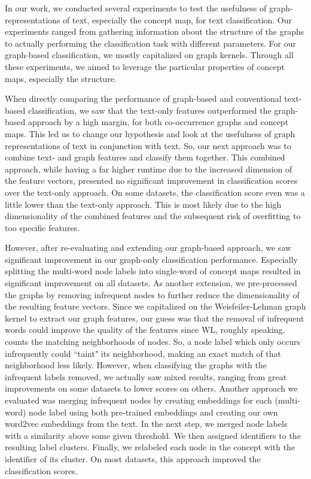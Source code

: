 In our work, we conducted several experiments to test the usefulness of graph-representations of text, especially the concept map, for text classification.
Our experiments ranged from gathering information about the structure of the graphs to actually performing the classification task with different parameters.
For our graph-based classification, we mostly capitalized on graph kernels.
Through all these experiments, we aimed to leverage the particular properties of concept maps, especially the structure.

When directly comparing the performance of graph-based and conventional text-based classification, we saw that the text-only features outperformed the graph-based approach by a high margin, for both co-occurrence graphs and concept maps.
This led us to change our hypothesis and look at the usefulness of graph representations of text in conjunction with text.
So, our next approach was to combine text- and graph features and classify them together.
This combined approach, while having a far higher runtime due to the increased dimension of the feature vectors, presented no significant improvement in classification scores over the text-only approach.
On some datasets, the classification score even was a little lower than the text-only approach.
This is most likely due to the high dimensionality of the combined features and the subsequent risk of overfitting to too specific features.

However, after re-evaluating and extending our graph-based approach, we saw significant improvement in our graph-only classification performance.
Especially splitting the multi-word node labels into single-word of concept maps resulted in significant improvement on all datasets.
As another extension, we pre-processed the graphs by removing infrequent nodes to further reduce the dimensionality of the resulting feature vectors.
Since we capitalized on the Weisfeiler-Lehman graph kernel to extract our graph features, our guess was that the removal of infrequent words could improve the quality of the features since WL, roughly speaking, counts the matching neighborhoods of nodes.
So, a node label which only occurs infrequently could ``taint" its neighborhood, making an exact match of that neighborhood less likely.
However, when classifying the graphs with the infrequent labels removed, we actually saw mixed results, ranging from great improvements on some datasets to lower scores on others.
Another approach we evaluated was merging infrequent nodes by creating embeddings for each (multi-word) node label using both pre-trained embeddings and creating our own word2vec embeddings from the text.
In the next step, we merged node labels with a similarity above some given threshold.
We then assigned identifiers to the resulting label clusters.
Finally, we relabeled each node in the concept with the identifier of its cluster.
On most datasets, this approach improved the classification scores.

